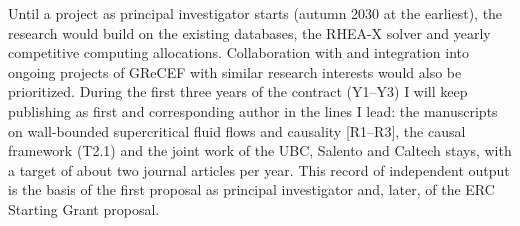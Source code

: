 \documentclass[11pt]{article}
\begin{document}
Until a project as principal investigator starts (autumn 2030 at the earliest), the research would build on the existing databases, the RHEA-X solver and yearly competitive computing allocations. 
Collaboration with and integration into ongoing projects of GReCEF with similar research interests would also be prioritized.
During the first three years of the contract (Y1--Y3) I will keep publishing as first and corresponding author in the lines I lead: the manuscripts on wall-bounded supercritical fluid flows and causality [R1--R3], the causal framework (T2.1) and the joint work of the UBC, Salento and Caltech stays, with a target of about two journal articles per year. 
This record of independent output is the basis of the first proposal as principal investigator and, later, of the ERC Starting Grant proposal.
\end{document}
